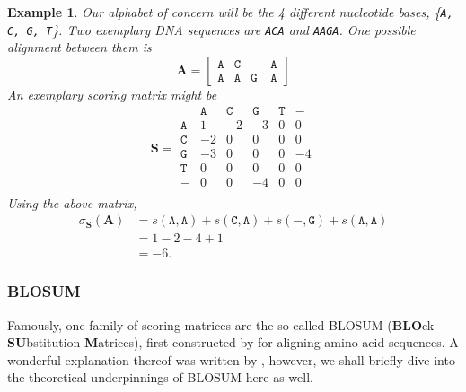 \documentclass{article}
\newtheorem{example}{Example}
\begin{document}
\begin{multicols}{2}
\begin{example}
    Our alphabet of concern will be the 4
    different nucleotide bases, \{\texttt{A, C, G, T}\}. Two exemplary DNA
    sequences are \texttt{ACA} and \texttt{AAGA}. One possible alignment between them is
    \begin{equation*}
        \mathbf A = \begin{bmatrix}
            \mathtt{A} & \mathtt{C} & \mathtt{-} & \mathtt{A} \\
            \mathtt{A} & \mathtt{A} & \mathtt{G} & \mathtt{A}
        \end{bmatrix}
    \end{equation*}
    An exemplary scoring matrix might be
    \begin{equation*}
        \mathbf S = \begin{matrix}
             & \mathtt{A} & \mathtt{C} & \mathtt{G} & \mathtt{T} &
            \mathtt{-}                                             \\ \mathtt{A} & 1          & -2         & -3         & 0
             &
            0
            \\ \mathtt{C} & -2         & 0          & 0          & 0
             & 0
            \\ \mathtt{G} & -3         & 0          & 0          & 0
             & -4
            \\ \mathtt{T} & 0          & 0          & 0          & 0
             & 0
            \\ \mathtt{-} & 0          & 0          & -4         & 0
             & 0
            \\
        \end{matrix}
    \end{equation*}
    Using the above matrix, \begin{align}
	    \sigma_{\mathbf S}(\mathbf A) &= s(\mathtt A, \mathtt A) + s(\mathtt C, \mathtt A) + s(\mathtt{-}, \mathtt{G}) + s(\mathtt{A}, \mathtt{A}) \\
					  &= 1 - 2 -4 + 1 \\
					  &= -6.
    \end{align}
\end{example}

\subsubsection*{BLOSUM}
Famously, one family of scoring matrices are the so called BLOSUM (\textbf{BLO}ck \textbf{SU}bstitution \textbf{M}atrices), first constructed by \textcite{henikoffAminoAcidSubstitution1992} for aligning amino acid sequences. A wonderful explanation thereof was written by
\textcite{eddyWhereDidBLOSUM622004}, however, we shall briefly dive into the
theoretical underpinnings of BLOSUM here as well.


\end{multicols}
\end{document}
